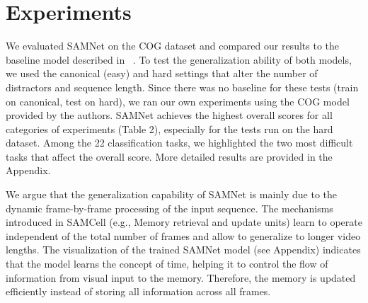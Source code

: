 \section{Experiments}

We evaluated SAMNet on the COG dataset and compared our results to the baseline model described in ~\cite{yang2018dataset}. To test the generalization ability of both models, we used the canonical (easy) and hard settings that alter the number of distractors and sequence length.  Since there was no baseline for these tests (train on canonical, test on hard), we ran our own experiments using the COG model provided by the authors.  SAMNet achieves the highest overall scores for all categories of experiments (Table 2), especially for the tests run on the hard dataset.  Among the 22 classification tasks, we highlighted the two most difficult tasks that affect the overall score.  More detailed results are provided in the Appendix.

We argue that the generalization capability of SAMNet is mainly due to the dynamic frame-by-frame processing of the input sequence.  The mechanisms introduced in SAMCell (e.g., Memory retrieval and update units) learn to operate independent of the total number of frames and allow to generalize to longer video lengths.  The visualization of the trained SAMNet model (see Appendix) indicates that the model learns the concept of time, helping it to control the flow of information from visual input to the memory.  Therefore, the memory is updated efficiently instead of storing all information across all frames.


%



